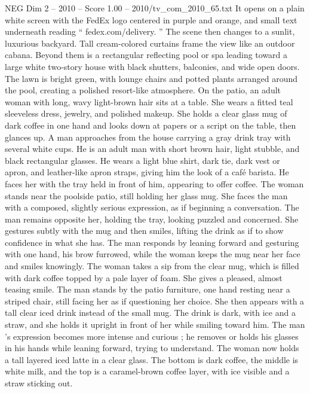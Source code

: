 \begin{textsample}{NEG Dim 2 – 2010 – Score 1.00 – 2010/tv\_com\_2010\_65.txt}  \label{ex:f2_neg_050}
It opens on a plain white screen with the FedEx logo centered in purple and orange, and small text underneath reading “ fedex.com/delivery. ” The scene then changes to a sunlit, luxurious backyard.
Tall cream-colored curtains frame the view like an outdoor cabana.
Beyond them is a rectangular reflecting pool or spa leading toward a large white two-story house with black shutters, balconies, and wide open doors.
The lawn is bright green, with lounge chairs and potted plants arranged around the pool, creating a polished resort-like atmosphere.
On the patio, an adult woman with long, wavy light-brown hair sits at a table.
She wears a fitted teal sleeveless dress, jewelry, and polished makeup.
She holds a clear glass mug of dark coffee in one hand and looks down at papers or a script on the table, then glances up.
A man approaches from the house carrying a gray drink tray with several white cups.
He is an adult man with short brown hair, light stubble, and black rectangular glasses.
He wears a light blue shirt, dark tie, dark vest or apron, and leather-like apron straps, giving him the look of a café barista.
He faces her with the tray held in front of him, appearing to offer coffee.
The woman stands near the poolside patio, still holding her glass mug.
She faces the man with a composed, slightly serious expression, as if beginning a conversation.
The man remains opposite her, holding the tray, looking puzzled and concerned.
She gestures subtly with the mug and then smiles, lifting the drink as if to show confidence in what she has.
The man responds by leaning forward and gesturing with one hand, his brow furrowed, while the woman keeps the mug near her face and smiles knowingly.
The woman takes a sip from the clear mug, which is filled with dark coffee topped by a pale layer of foam.
She gives a pleased, almost teasing smile.
The man stands by the patio furniture, one hand resting near a striped chair, still facing her as if questioning her choice.
She then appears with a tall clear iced drink instead of the small mug.
The drink is dark, with ice and a straw, and she holds it upright in front of her while smiling toward him.
The man ’s expression becomes more intense and curious ; he removes or holds his glasses in his hands while leaning forward, trying to understand.
The woman now holds a tall layered iced latte in a clear glass.
The bottom is dark coffee, the middle is white milk, and the top is a caramel-brown coffee layer, with ice visible and a straw sticking out.

\end{textsample}
